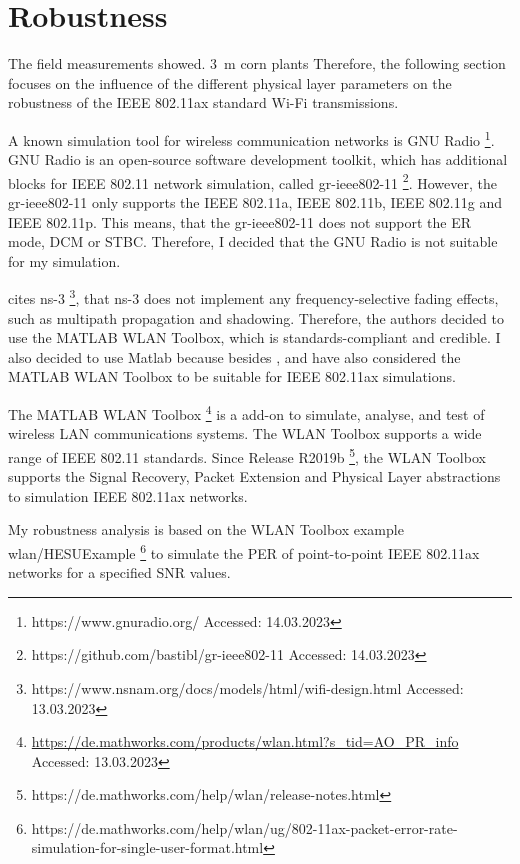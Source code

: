 \section{Robustness}
The field measurements showed.
\cite{smolnik_5g_2020} \SI{3}{\metre} corn plants
Therefore, the following section focuses on the influence of the different physical layer parameters on the robustness of the IEEE 802.11ax standard
Wi-Fi transmissions.

A known simulation tool for wireless communication networks is GNU Radio \footnote{https://www.gnuradio.org/ Accessed: 14.03.2023}.
GNU Radio is an open-source software development toolkit, which has additional blocks for IEEE 802.11 network simulation,
called gr-ieee802-11 \footnote{https://github.com/bastibl/gr-ieee802-11 Accessed: 14.03.2023}. However, the gr-ieee802-11 only
supports the IEEE 802.11a, IEEE 802.11b, IEEE 802.11g and IEEE 802.11p. This means, that the gr-ieee802-11 does not support
the \ac{ER} mode, \ac{DCM} or \ac{STBC}. Therefore, I decided that the GNU Radio is not suitable for my simulation.

\textcite{s_performance_2022} cites ns-3 \footnote{https://www.nsnam.org/docs/models/html/wifi-design.html Accessed: 13.03.2023},
that ns-3 does not implement
any frequency-selective fading effects, such as multipath propagation and shadowing. Therefore, the authors decided to use
the MATLAB WLAN Toolbox, which is standards-compliant and credible.
I also decided to use Matlab because besides \cite{s_performance_2022}, \cite{cao_efficient_2022} and \cite{jin_efficient_2021} have also considered
the MATLAB WLAN Toolbox to be suitable for IEEE 802.11ax simulations.

The MATLAB WLAN Toolbox \footnote{\url{https://de.mathworks.com/products/wlan.html?s_tid=AO_PR_info} Accessed: 13.03.2023} is a add-on to simulate, analyse, and test of wireless LAN communications systems.
The WLAN Toolbox supports a wide range of IEEE 802.11 standards.
Since Release R2019b \footnote{https://de.mathworks.com/help/wlan/release-notes.html}, the WLAN Toolbox supports the Signal Recovery, Packet Extension and Physical Layer abstractions to simulation IEEE 802.11ax networks.

My robustness analysis is based on the WLAN Toolbox example wlan/HESUExample \footnote{https://de.mathworks.com/help/wlan/ug/802-11ax-packet-error-rate-simulation-for-single-user-format.html} to simulate the \ac{PER} of point-to-point IEEE 802.11ax networks for
a specified \ac{SNR} values.

